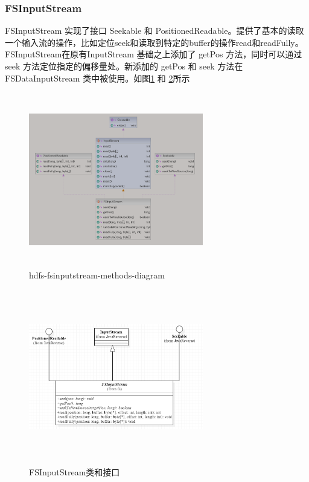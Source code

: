 	\subsubsection{FSInputStream}
	FSInputStream 实现了接口 Seekable 和 PositionedReadable。提供了基本的读取一个输入流的操作，比如定位seek和读取到特定的buffer的操作read和readFully。FSInputStream在原有InputStream 基础之上添加了 getPos 方法，同时可以通过 seek 方法定位指定的偏移量处。新添加的 getPos 和 seek 方法在 FSDataInputStream 类中被使用。如图\ref{fig:graph3} 和 \ref{fig:graph4}所示
	
	\begin{figure}
		\centering
		\includegraphics[width=3in,height=3in]{UML/inputstream/hdfs-fsinputstream-methods-diagram.png}
		\caption{hdfs-fsinputstream-methods-diagram}
		\label{fig:graph3}
	\end{figure}
	\begin{figure}
		\centering
		\includegraphics[width=3in,height=3in]{UML/inputstream/UML.png}
		\caption{FSInputStream类和接口}
		\label{fig:graph4}
	\end{figure}
	
